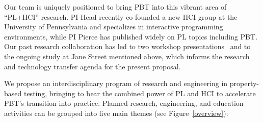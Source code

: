 Our team
is uniquely positioned to bring PBT into this vibrant area
of ``PL+HCI'' research.  PI Head recently
co-founded a new HCI group at
the University of Pennsylvania and specializes in interactive
programming environments, while PI Pierce has published widely on PL
topics including PBT.  Our past research collaboration has led to
two workshop
presentations~\cite{goldstein_problems_2022,shi_towards_2023} and to the ongoing
study at Jane Street mentioned above, which informs the
research and technology transfer agenda for the present proposal.

\smallskip

We propose an interdisciplinary program of research and
engineering in
{property-based testing}, bringing to
bear the combined power of PL and HCI to accelerate PBT's transition
into practice.
%
Planned research,
engineering, and education activities can be grouped into five main
themes (see Figure~\ref{overview}):
%
